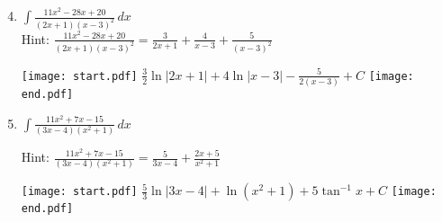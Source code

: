\documentclass[12pt]{article}
\begin{document}

\begin{enumerate}
\setcounter{enumi}{3}

\item $\int \frac{11x^2-28x+20}{(2x+1)(x-3)^2} \,dx$\\

Hint: $\frac{11x^2-28x+20}{(2x+1)(x-3)^2} = \frac{3}{2x+1}+\frac{4}{x-3}+\frac{5}{(x-3)^2}$

\texttt{[image: start.pdf]}
{{$\frac{3}{2}\ln{|2x+1|}+4\ln{|x-3|}-\frac{5}{2(x-3)}+C$}}
\texttt{[image: end.pdf]}


\item $\int \frac{11x^2+7x-15}{(3x-4)(x^2+1)} \,dx$

Hint: $\frac{11x^2+7x-15}{(3x-4)(x^2+1)} = \frac{5}{3x-4}+\frac{2x+5}{x^2+1}$

\texttt{[image: start.pdf]}
{{$\frac{5}{3}\ln{|3x-4|}+\ln(x^2+1)+5\tan^{-1}{x}+C$}}
\texttt{[image: end.pdf]}


\end{enumerate}

\newpage

\end{document}
